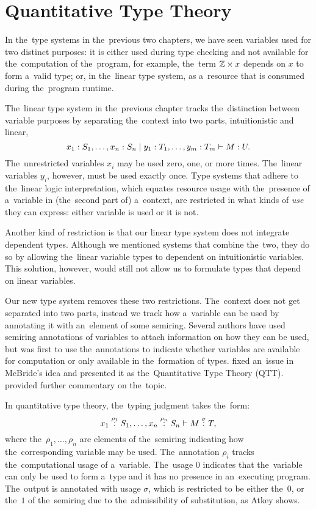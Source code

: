 \chapter{Quantitative Type Theory}\label{cha:qtt}

In the~type systems in the~previous two chapters, we have seen variables used
for two distinct purposes: it is either used during type checking and not
available for the~computation of the~program, for example, the~term $\mathbb{Z} \times
x$ depends on $x$ to form a~valid type; or, in the~linear type system, as
a~resource that is consumed during the~program runtime.

The~linear type system in the~previous chapter tracks the~distinction between
variable purposes by separating the~context into two parts, intuitionistic and
linear,
\[
  x_1 \overset{}: S_1, \dotsc, x_n \overset{}: S_n \mid y_1 \overset{}: T_1, \dotsc, y_m \overset{}: T_m
    \vdash M \overset{}: U.
\]
The~unrestricted variables $x_i$ may be used zero, one, or more times.
The~linear variables $y_i$, however, must be used exactly once. Type systems
that adhere to the~linear logic interpretation, which equates resource usage
with the~presence of a~variable in (the~second part of) a~context, are
restricted in what kinds of \emph{use} they can express: either variable is used
or it is not.

Another kind of restriction is that our linear type system does not integrate
dependent types. Although we mentioned systems that combine the~two, they do so
by allowing the~linear variable types to dependent on intuitionistic variables.
This solution, however, would still not allow us to formulate types that depend
on linear variables.

Our new type system removes these two restrictions. The~context does not get
separated into two parts, instead we track how a~variable can be used by
annotating it with an~element of some semiring. Several authors have used
semiring annotations of variables to attach information on how they can be used,
but \citet{mcbride_2016} was first to use the~annotations to indicate
whether variables are available for computation or only available in
the~formation of types. \citet{atkey_2018} fixed an~issue in McBride's idea and
presented it as the~Quantitative Type Theory (QTT). \citet{weirich_2020}
provided further commentary on the~topic.


In quantitative type theory, the~typing judgment takes the~form:
\[
  x_1 \overset{\rho_1}: S_1, \dotsc, x_n \overset{\rho_n}: S_n \vdash M \overset{\sigma}: T,
\]
where the~$\rho_1, \dotsc, \rho_n$ are elements of the~semiring indicating
how the~corresponding variable may be used. The~annotation $\rho_i$ tracks
the~computational usage of a~variable. The~usage $0$ indicates that the~variable
can only be used to form a~type and it has no presence in an~executing program.
The~output is annotated with usage $\sigma$, which is restricted to be either
the~$0$, or the~$1$ of the~semiring due to the~admissibility of substitution, as
Atkey shows.

